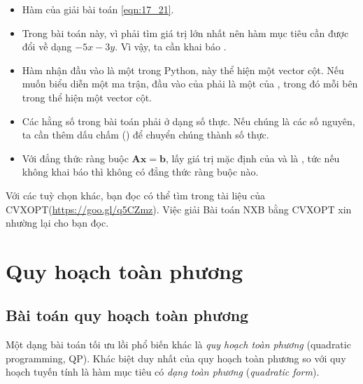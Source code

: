 \begin{itemize}
    \item Hàm  của  giải bài toán \eqref{eqn:17_21}. 
     
    \item Trong bài toán này, vì phải tìm giá trị lớn nhất nên hàm mục tiêu cần được đổi về dạng $-5x - 3y$. Vì vậy, ta cần khai báo . 
     
    \item Hàm  nhận đầu vào là một  trong Python,  này thể hiện một vector cột. Nếu muốn biểu diễn một ma trận, đầu vào của  phải là một  của , trong đó mỗi  bên trong thể hiện một vector cột. 
     
    \item Các hằng số trong bài toán phải ở dạng số thực. Nếu chúng là các số
    nguyên, ta cần thêm dấu chấm () để chuyển chúng thành số thực.
     
    \item Với đẳng thức ràng buộc $\mathbf{Ax} = \mathbf{b}$,
     lấy giá trị mặc định của  và
     là , tức nếu không khai báo thì không có đẳng thức ràng buộc nào.
    
\end{itemize}
Với các tuỳ chọn khác, bạn đọc có thể tìm trong tài liệu của CVXOPT(\url{https://goo.gl/q5CZmz}).
Việc giải Bài toán NXB bằng CVXOPT xin nhường lại cho bạn đọc.
 
\section{Quy hoạch toàn phương}
 
\subsection{Bài toán quy hoạch toàn phương}
Một dạng bài toán tối ưu lồi phổ biến khác là \textit{quy hoạch toàn phương} (quadratic
programming, QP). Khác biệt duy nhất của quy hoạch toàn phương so
với quy hoạch tuyến tính là hàm mục tiêu có \textit{dạng toàn phương} (\textit{quadratic form}).

